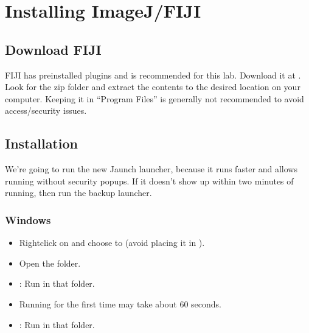 \documentclass[letterpaper,10pt,english]{jupyterBook}
\begin{document}
\sphinxstepscope


\chapter{Installing ImageJ/FIJI}
\label{\detokenize{installation:installing-imagej-fiji}}\label{\detokenize{installation::doc}}

\section{Download FIJI}
\label{\detokenize{installation:download-fiji}}
\sphinxAtStartPar
FIJI has pre\sphinxhyphen{}installed plugins and is recommended for this lab.
Download it at .
Look for the zip folder and extract the contents to the desired location on your computer. Keeping it in “Program Files” is generally not recommended to avoid access/security issues.


\section{Installation}
\label{\detokenize{installation:installation}}
\sphinxAtStartPar
We’re going to run the new Jaunch launcher, because it runs faster and allows running without security popups. If it doesn’t show up within two minutes of running, then run the backup launcher.


\subsection{Windows}
\label{\detokenize{installation:windows}}\begin{itemize}
\item {} 
\sphinxAtStartPar
Right\sphinxhyphen{}click on  and choose  to  (avoid placing it in ).

\item {} 
\sphinxAtStartPar
Open the  folder.

\item {} 
\sphinxAtStartPar
{}: Run   in that folder.

\item {} 
\sphinxAtStartPar
Running for the first time may take about 60 seconds.

\item {} 
\sphinxAtStartPar
{}: Run  in that folder.

\end{itemize}
\end{document}
